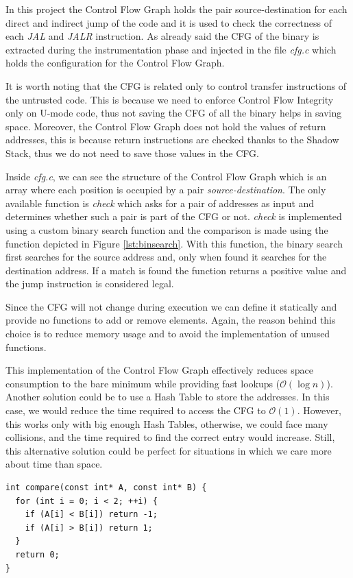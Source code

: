 In this project the Control Flow Graph holds the pair source-destination for each
direct and indirect jump of the code and it is used to check the correctness of each
\textit{JAL} and \textit{JALR} instruction. As already said the CFG of the
binary is extracted during the instrumentation phase and injected in the file
\textit{cfg.c} which holds the configuration for the Control Flow Graph.

It is worth noting that the CFG is related only to control transfer instructions
of the untrusted code. This is because we need to enforce Control Flow Integrity
only on U-mode code, thus not saving the CFG of all the binary helps in saving space.
Moreover, the Control Flow Graph does not hold the values of return addresses,
this is because return instructions are checked thanks to the Shadow Stack, thus
we do not need to save those values in the CFG.

Inside \textit{cfg.c}, we can see the structure of the Control Flow Graph which is
an array where each position is occupied by a pair \textit{source-destination}. The
only available function is \textit{check} which asks for a pair of addresses as
input and determines whether such a pair is part of the CFG or not. \textit{check}
is implemented using a custom binary search function and the comparison is made
using the function depicted in Figure \ref{lst:binsearch}. With this function,
the binary search first searches for the source address and, only when found it searches
for the destination address. If a match is found the function returns a positive
value and the jump instruction is considered legal.

Since the CFG will not change during execution we can define it statically and
provide no functions to add or remove elements. Again, the reason behind this
choice is to reduce memory usage and to avoid the implementation of unused
functions.

This implementation of the Control Flow Graph effectively reduces space
consumption to the bare minimum while providing fast lookups ($\mathcal{O}(\log{n}
)$). Another solution could be to use a Hash Table to store the addresses. In
this case, we would reduce the time required to access the CFG to $\mathcal{O}(1)$.
However, this works only with big enough Hash Tables, otherwise, we could face many
collisions, and the time required to find the correct entry would increase. Still,
this alternative solution could be perfect for situations in which we care more
about time than space.

\begin{lstlisting}[style=CStyle, caption= Comparison for binary search, label={lst:binsearch}]
int compare(const int* A, const int* B) {
  for (int i = 0; i < 2; ++i) {
    if (A[i] < B[i]) return -1;
    if (A[i] > B[i]) return 1;
  }
  return 0;
}
\end{lstlisting}

